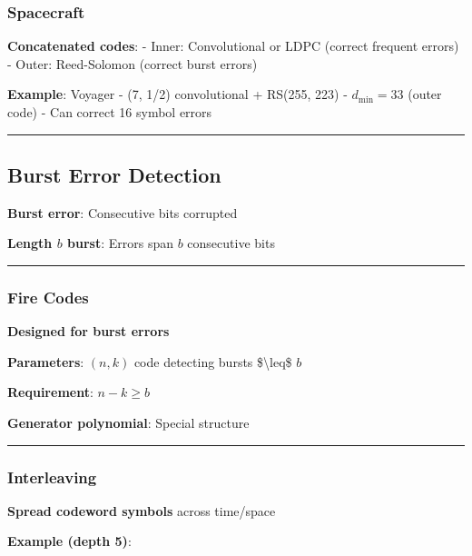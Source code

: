 \subsubsection{Spacecraft}\label{spacecraft}

\textbf{Concatenated codes}: - Inner: Convolutional or LDPC (correct
frequent errors) - Outer: Reed-Solomon (correct burst errors)

\textbf{Example}: Voyager - (7, 1/2) convolutional + RS(255, 223) -
\(d_{\min} = 33\) (outer code) - Can correct 16 symbol errors

\begin{center}\rule{0.5\linewidth}{0.5pt}\end{center}

\subsection{Burst Error Detection}\label{burst-error-detection}

\textbf{Burst error}: Consecutive bits corrupted

\textbf{Length \(b\) burst}: Errors span \(b\) consecutive bits

\begin{center}\rule{0.5\linewidth}{0.5pt}\end{center}

\subsubsection{Fire Codes}\label{fire-codes}

\textbf{Designed for burst errors}

\textbf{Parameters}: \((n, k)\) code detecting bursts
\$\textbackslash leq\$ \(b\)

\textbf{Requirement}: \(n - k \geq b\)

\textbf{Generator polynomial}: Special structure

\begin{center}\rule{0.5\linewidth}{0.5pt}\end{center}

\subsubsection{Interleaving}\label{interleaving}

\textbf{Spread codeword symbols} across time/space

\textbf{Example (depth 5)}:


